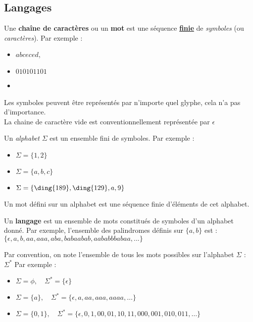 
\subsection{Langages}
\label{subsec:Langages}

\begin{mydef}
    Une \textbf{chaîne de caractères} ou un \textbf{mot} est une séquence \textbf{\underline{finie}} de \emph{symboles} (ou \emph{caractères}). Par exemple :
    	\begin{itemize}
    		\item $abceced$,
    		\item $010101101$
    		\item {}
    	\end{itemize}
    Les symboles peuvent être représentés par n'importe quel glyphe, cela n'a pas d'importance.\\
    La chaine de caractère vide est conventionnellement représentée par $\epsilon$
\end{mydef}
\begin{mydef}
    Un \emph{alphabet} $\Sigma$ est un ensemble fini de symboles. Par exemple :
    \begin{itemize}
        \item $\Sigma = \{1, 2\}$
        \item $\Sigma = \{a, b, c\}$
        \item $\Sigma = \{\ding{189},\ding{129},a,9\}$
    \end{itemize}
\end{mydef}
\begin{myrem}
    Un mot défini sur un alphabet est une séquence finie d'éléments de cet alphabet.
\end{myrem}
\begin{mydef}
    Un \textbf{langage} est un ensemble de mots constitués de symboles d'un alphabet donné. Par exemple, l'ensemble des palindromes définis sur $\{a, b\}$ est : $\{\epsilon, a, b, aa, aaa, aba, babaabab, aababbbabaa, ...\}$
\end{mydef}
\begin{myrem}
  Par convention, on note l'ensemble de tous les mots possibles sur l'alphabet $\Sigma$ :\; $\Sigma^*$
  Par exemple :
  \begin{itemize}
		\item $\Sigma = \phi,\quad \Sigma^* = \{\epsilon\}$
		\item $\Sigma = \{a\},\quad \Sigma^* = \{\epsilon, a,aa,aaa,aaaa, \ldots\}$
		\item $\Sigma = \{0,1\},\quad \Sigma^* = \{\epsilon, 0,1,00,01,10,11,000,001,010,011, \ldots\}$
  \end{itemize}
\end{myrem}

